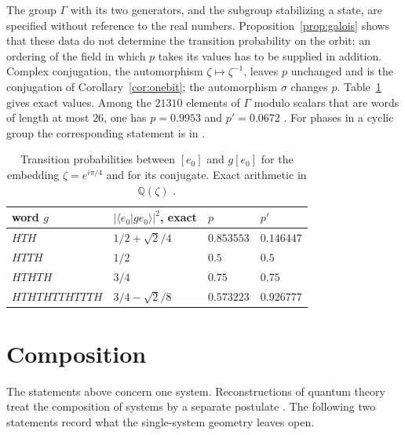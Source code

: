 The group $\Gamma$ with its two generators, and the subgroup stabilizing a state, are specified without reference to the real numbers. Proposition~\ref{prop:galois} shows that these data do not determine the transition probability on the orbit: an ordering of the field in which $p$ takes its values has to be supplied in addition. Complex conjugation, the automorphism $\zeta\mapsto\zeta^{-1}$, leaves $p$ unchanged and is the conjugation of Corollary~\ref{cor:onebit}; the automorphism $\sigma$ changes $p$. Table~\ref{tab:galois} gives exact values. Among the $21310$ elements of $\Gamma$ modulo scalars that are words of length at most $26$, one has $p=0.9953$ and $p'=0.0672$ \cite{comp2}. For phases in a cyclic group the corresponding statement is in \cite{g8}.

\begin{table}[ht]\centering\small
\begin{tabular}{@{}llll@{}}\toprule
word $g$ & $|\langle e_0|ge_0\rangle|^2$, exact & $p$ & $p'$\\\midrule
$HTH$ & $1/2+\sqrt2/4$ & $0.853553$ & $0.146447$\\
$HTTH$ & $1/2$ & $0.5$ & $0.5$\\
$HTHTH$ & $3/4$ & $0.75$ & $0.75$\\
$HTHTHTTHTTTH$ & $3/4-\sqrt2/8$ & $0.573223$ & $0.926777$\\\bottomrule
\end{tabular}
\caption{Transition probabilities between $[e_0]$ and $g[e_0]$ for the embedding $\zeta=e^{i\pi/4}$ and for its conjugate. Exact arithmetic in $\mathbb{Q}(\zeta)$ \cite{comp2}.}\label{tab:galois}
\end{table}

\section{Composition}\label{sec:comp}

The statements above concern one system. Reconstructions of quantum theory treat the composition of systems by a separate postulate \cite{hardy,masanesmueller}. The following two statements record what the single-system geometry leaves open.

